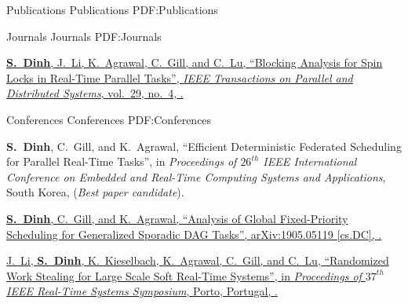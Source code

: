 \documentclass[letterpaper,MMMyyyy,nonstopmode]{simpleresumecv}
\begin{document}
\begin{Body}

\Section
{Publications}
{Publications}
{PDF:Publications}

\SubSection
{Journals}
{Journals}
{PDF:Journals}

\begingroup
\renewcommand{\MaxNumberedItem}{[100]}

\BigGap
\NumberedItem{[1]}
\href{https://ieeexplore.ieee.org/document/8122044/}
{\textbf{S.~Dinh}, J.~Li, K.~Agrawal, C.~Gill, and C.~Lu,
``Blocking Analysis for Spin Locks in Real-Time Parallel Tasks'',
\textit{IEEE Transactions on Parallel and Distributed Systems},
vol.~29,
no.~4,
.}


\endgroup

\BigGap
\SubSection
{Conferences}
{Conferences}
{PDF:Conferences}

\begingroup
\renewcommand{\MaxNumberedItem}{[100]}

\BigGap
\NumberedItem{[1]}
{\textbf{S.~Dinh}, C.~Gill, and K.~Agrawal,
``Efficient Deterministic Federated Scheduling for Parallel Real-Time Tasks'', 
in \textit{Proceedings of $26^{th}$ IEEE International Conference on Embedded and Real-Time 
Computing Systems and Applications}, South Korea, 
 (\textit{Best paper candidate}).}

\Gap
\NumberedItem{[2]}
\href{https://arxiv.org/abs/1905.05119}
{\textbf{S.~Dinh}, C.~Gill, and K.~Agrawal,
``Analysis of Global Fixed-Priority Scheduling for Generalized Sporadic DAG Tasks'', 
arXiv:1905.05119 [cs.DC],
.}

\Gap
\NumberedItem{[3]}
\href{https://ieeexplore.ieee.org/document/7809856/}
{J.~Li, \textbf{S.~Dinh}, K.~Kieselbach, K.~Agrawal, C.~Gill, and C.~Lu,
``Randomized Work Stealing for Large Scale Soft Real-Time Systems'',
in \textit{Proceedings of $37^{th}$ IEEE Real-Time Systems Symposium},
Porto, Portugal,
.}



\end{Body}
\end{document}
